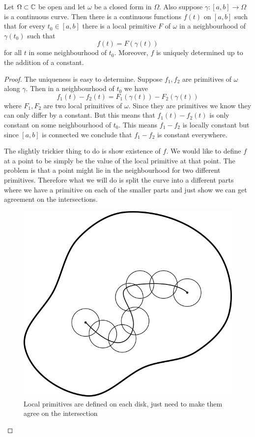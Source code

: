 \begin{proposition}\label{prop:primitive-along-curve}
Let $\Omega \subset \mathbb{C}$ be open and let $\omega$ be a closed form in $\Omega$. Also suppose $\gamma: [a, b] \to \Omega$ is a continuous curve. Then there is a continuous functions $f(t)$ on $[a, b]$ such that for every $t_0 \in [a, b]$ there is a local primitive $F$ of $\omega$ in a neighbourhood of $\gamma(t_0)$ such that 
$$ f(t) = F(\gamma(t)) $$
for all $t$ in some neighbourhood of $t_0$. Moreover, $f$ is uniquely determined up to the addition of a constant.
\end{proposition}
\begin{proof}
    The uniqueness is easy to determine. Suppose $f_1, f_2$ are primitives of $\omega$ along $\gamma$. Then in a neighbourhood of $t_0$ we have
    $$ f_1(t) - f_2(t) = F_1(\gamma(t)) - F_2(\gamma(t)) $$
    where $F_1, F_2$ are two local primitives of $\omega$. Since they are primitives we know they can only differ by a constant. But this means that $f_1(t) - f_2(t)$ is only constant on some neighbourhood of $t_0$. This means $f_1 - f_2$ is locally constant but since $[a, b]$ is connected we conclude that $f_1 - f_2$ is constant everywhere.
    
    The slightly trickier thing to do is show existence of $f$. We would like to define $f$ at a point to be simply be the value of the local primitive at that point. The problem is that a point might lie in the neighbourhood for two different primitives. Therefore what we will do is split the curve into a different parts where we have a primitive on each of the smaller parts and just show we can get agreement on the intersections. 

    \begin{figure}
        \centering
        \includegraphics[scale=0.7]{Images/primitives_along_curves.png}
        \caption{Local primitives are defined on each disk, just need to make them agree on the intersection}
        \label{fig:prim-along-curve}
    \end{figure}
    

\end{proof}
